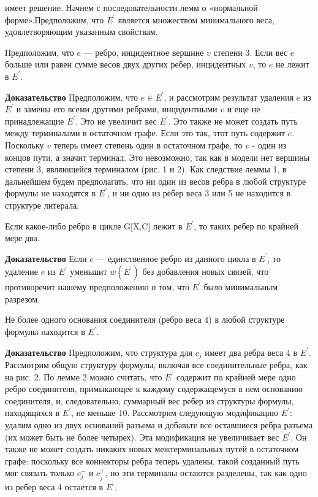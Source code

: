 имеет решение. Начнем с последовательности лемм о «нормальной форме».Предположим, что \(E^'\) является множеством минимального веса, удовлетворяющим указанным свойствам.
\begin{lemma} Предположим, что \(e\) — ребро, инцидентное вершине \(v\) степени 3. Если вес \(e\) больше или равен сумме весов двух других ребер, инцидентных \(v\), то \(e\) не лежит в \(E^'\).
\end{lemma}
\textbf{Доказательство} Предположим, что \(e \in E^'\), и рассмотрим результат удаления \(e\) из \(E^'\) и замены его всеми другими ребрами, инцидентными \(v\) и еще не принадлежащие \(E^'\). Это не увеличит вес \(E^'\). Это также не может создать путь между терминалами в остаточном графе. Если это так,
этот путь содержит \(e\). Поскольку \(v\) теперь имеет степень один в остаточном графе, то \(v\) - один из концов пути, а значит терминал. Это невозможно, так как в модели нет вершины степени 3, являющейся терминалом (рис. 1 и 2).
Как следствие леммы 1, в дальнейшем будем предполагать, что ни один из весов
ребра в любой структуре формулы не находятся в \(E^'\), и ни одно из ребер веса 3 или 5 не находится в  структуре литерала.
\begin{lemma} Если какое-либо ребро в цикле G[X,C] лежит в \(E^'\), то таких ребер по крайней мере два.
\end{lemma}
\textbf{Доказательство} Если \(e\) — единственное ребро из данного цикла в \(E^'\), то удаление \(e\) из \(E^'\) уменьшит \(w(E^')\) без добавления новых связей, что противоречит нашему предположению о том, что \(E^'\) было минимальным разрезом.
\begin{lemma} Не более одного основания соединителя (ребро веса \(4\)) в любой структуре формулы находится в \(E^'\).
\end{lemma}
\textbf{Доказательство} Предположим, что структура для \(c_j\) имеет два ребра веса \(4\) в \(E^'\). Рассмотрим общую структуру формулы, включая все соединительные ребра, как на рис. 2. По лемме 2 можно считать, что \(E^'\) содержит по крайней мере одно ребро соединителя, примыкающее к каждому содержащемуся в нем основанию соединителя, и, следовательно, суммарный вес ребер из структуры формулы, находящихся в \(E^'\), не меньше 10. Рассмотрим следующую модификацию \(E^'\): удалим одно из двух оснований разъема и добавьте все оставшиеся ребра разъема (их может быть не более четырех). Эта модификация не увеличивает вес \(E^'\). Он также не может создать никаких новых межтерминальных путей в остаточном графе: поскольку все коннекторы ребра теперь удалены, такой созданный путь мог связать только \(c_j^-\) и \(c_j^+\), но эти терминалы остаются разделены, так как одно из ребер веса 4 остается в \(E^'\).
